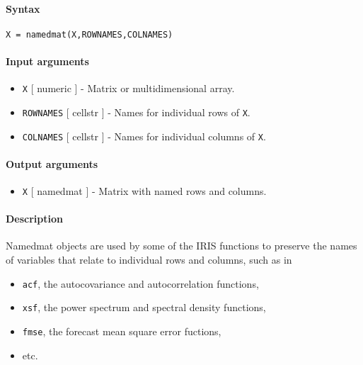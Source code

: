 


	\paragraph{Syntax}

\begin{verbatim}
X = namedmat(X,ROWNAMES,COLNAMES)
\end{verbatim}

\paragraph{Input arguments}

\begin{itemize}
\item
  \texttt{X} {[} numeric {]} - Matrix or multidimensional array.
\item
  \texttt{ROWNAMES} {[} cellstr {]} - Names for individual rows of
  \texttt{X}.
\item
  \texttt{COLNAMES} {[} cellstr {]} - Names for individual columns of
  \texttt{X}.
\end{itemize}

\paragraph{Output arguments}

\begin{itemize}
\itemsep1pt\parskip0pt
\item
  \texttt{X} {[} namedmat {]} - Matrix with named rows and columns.
\end{itemize}

\paragraph{Description}

Namedmat objects are used by some of the IRIS functions to preserve the
names of variables that relate to individual rows and columns, such as
in

\begin{itemize}
\itemsep1pt\parskip0pt
\item
  \texttt{acf}, the autocovariance and autocorrelation functions,
\item
  \texttt{xsf}, the power spectrum and spectral density functions,
\item
  \texttt{fmse}, the forecast mean square error fuctions,
\item
  etc.
\end{itemize}


